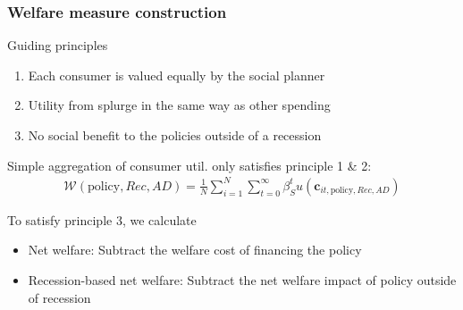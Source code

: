 \documentclass[pdflatex,aspectratio=169]{beamer}
\begin{document}
	\begin{frame}
		\frametitle{Welfare measure construction}
		\hypertarget{WelfareMeasure}{}
		
		Guiding principles
		
		\begin{enumerate}
			\item Each consumer is valued equally by the social planner 
			\item Utility from splurge in the same way as other spending
			\item No social benefit to the policies outside of a recession
		\end{enumerate} 
		
		\vspace{0.6cm}
		
		Simple aggregation of consumer util. only satisfies principle 1 \& 2:
		\begin{align*}
			\mathcal{W}(\text{policy},Rec,AD) =\frac{1}{N}\sum_{i=1}^{N} \sum_{t=0}^{\infty} \beta_S^t u(\mathbf{c}_{it,\text{policy},Rec,AD})
		\end{align*}
		
		\pause
		
		To satisfy principle 3, we calculate
		
		\begin{itemize}[<+->]
			\item Net welfare: Subtract the welfare cost of financing the policy
			\item Recession-based net welfare: Subtract the net welfare impact of policy outside of recession
		\end{itemize}	
	
		\vspace{0.2cm}
		\hyperlink{WelfareMeasure1}{}
		
	\end{frame}
\end{document}
